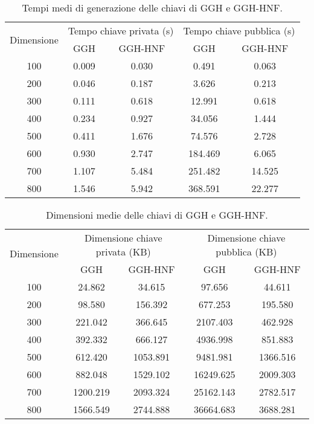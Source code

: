 \begin{table}[H]
    \centering
    \begin{tabular}{|c|c|c|c|c|}
        \hline
        \multirow{2}{*}{Dimensione} & 
        \multicolumn{2}{c|}{Tempo chiave privata (s)} & 
        \multicolumn{2}{c|}{Tempo chiave pubblica (s)} \\
        \cline{2-5}
        & GGH & GGH-HNF & GGH & GGH-HNF \\
        \hline
        100 & 0.009 & 0.030 & 0.491 & 0.063 \\
        200 & 0.046 & 0.187 & 3.626 & 0.213 \\
        300 & 0.111 & 0.618 & 12.991 & 0.618 \\
        400 & 0.234 & 0.927 & 34.056 & 1.444 \\
        500 & 0.411 & 1.676 & 74.576 & 2.728 \\
        600 & 0.930 & 2.747 & 184.469 & 6.065 \\
        700 & 1.107 & 5.484 & 251.482 & 14.525 \\
        800 & 1.546 & 5.942 & 368.591 & 22.277 \\
        \hline
    \end{tabular}
    \caption{Tempi medi di generazione delle chiavi di GGH e GGH-HNF.}
    \label{tab:key_gen_comparison}

\end{table}

\begin{table}[htbp]
    \centering
    \begin{tabular}{|c|c|c|c|c|}
        \hline
        \multirow{2}{*}{Dimensione} & 
        \multicolumn{2}{c|}{Dimensione chiave privata (KB)} & 
        \multicolumn{2}{c|}{Dimensione chiave pubblica (KB)} \\
        \cline{2-5}
        & GGH & GGH-HNF & GGH & GGH-HNF \\
        \hline
        100 & 24.862 & 34.615 & 97.656 & 44.611 \\
        200 & 98.580 & 156.392 & 677.253 & 195.580 \\
        300 & 221.042 & 366.645 & 2107.403 & 462.928 \\
        400 & 392.332 & 666.127 & 4936.998 & 851.883 \\
        500 & 612.420 & 1053.891 & 9481.981 & 1366.516 \\
        600 & 882.048 & 1529.102 & 16249.625  & 2009.303 \\
        700 & 1200.219 & 2093.324 & 25162.143 & 2782.517 \\
        800 & 1566.549 & 2744.888 & 36664.683 & 3688.281 \\
        \hline
    \end{tabular}
    \caption{Dimensioni medie delle chiavi di GGH e GGH-HNF.}
    \label{tab:key_size_comparison}
\end{table}

